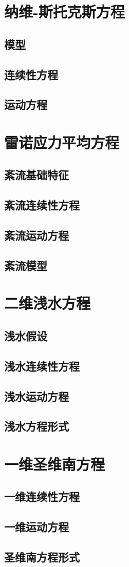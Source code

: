 \section{纳维-斯托克斯方程}
\subsection{模型}
\subsection{连续性方程}
\subsection{运动方程}
\section{雷诺应力平均方程}
\subsection{紊流基础特征}
\subsection{紊流连续性方程}
\subsection{紊流运动方程}
\subsection{紊流模型}
\section{二维浅水方程}
\subsection{浅水假设}
\subsection{浅水连续性方程}
\subsection{浅水运动方程}
\subsection{浅水方程形式}
\section{一维圣维南方程}
\subsection{一维连续性方程}
\subsection{一维运动方程}
\subsection{圣维南方程形式}
